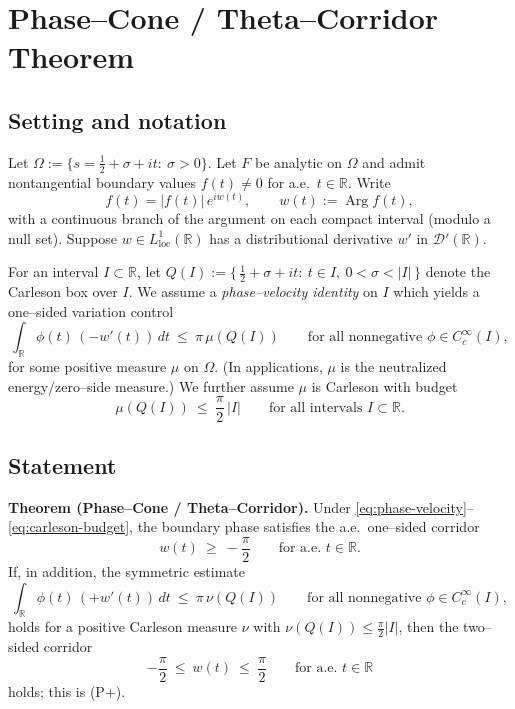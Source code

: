

\section*{Phase–Cone / Theta–Corridor Theorem}


\subsection*{Setting and notation}
Let \(\Omega:=\{s=\tfrac12+\sigma+it:\ \sigma>0\}\). Let \(F\) be analytic on \(\Omega\) and admit nontangential boundary values \(f(t)\neq 0\) for a.e.\ \(t\in\mathbb R\). Write
\[
 f(t)=|f(t)|\,e^{i w(t)},\qquad w(t):=\operatorname{Arg} f(t),
\]
with a continuous branch of the argument on each compact interval (modulo a null set). Suppose \(w\in L^1_{\mathrm{loc}}(\mathbb R)\) has a distributional derivative \(w'\) in \(\mathcal D'(\mathbb R)\).


For an interval \(I\subset\mathbb R\), let \(Q(I):=\{\,\tfrac12+\sigma+it:\ t\in I,\ 0<\sigma<|I|\,\}\) denote the Carleson box over \(I\). We assume a \emph{phase–velocity identity} on \(I\) which yields a one–sided variation control
\begin{equation}\label{eq:phase-velocity}
\int_{\mathbb R} \phi(t)\,(-w'(t))\,dt\ \le\ \pi\,\mu(Q(I))
\qquad\text{for all nonnegative }\phi\in C_c^\infty(I),
\end{equation}
for some positive measure \(\mu\) on \(\Omega\). (In applications, \(\mu\) is the neutralized energy/zero–side measure.) We further assume \(\mu\) is Carleson with budget
\begin{equation}\label{eq:carleson-budget}
\mu(Q(I))\ \le\ \frac{\pi}{2}\,|I|\qquad\text{for all intervals }I\subset\mathbb R.
\end{equation}


\subsection*{Statement}
\noindent\textbf{Theorem (Phase–Cone / Theta–Corridor).}
Under \eqref{eq:phase-velocity}–\eqref{eq:carleson-budget}, the boundary phase satisfies the a.e.\ one–sided corridor
\[
 w(t)\ \ge\ -\frac{\pi}{2}\qquad\text{for a.e. }t\in\mathbb R.
\]
If, in addition, the symmetric estimate
\begin{equation}\label{eq:phase-velocity-plus}
\int_{\mathbb R} \phi(t)\,(+w'(t))\,dt\ \le\ \pi\,\nu(Q(I))
\qquad\text{for all nonnegative }\phi\in C_c^\infty(I),
\end{equation}
holds for a positive Carleson measure \(\nu\) with \(\nu(Q(I))\le \tfrac{\pi}{2}|I|\), then the two–sided corridor
\[
 -\frac{\pi}{2}\ \le\ w(t)\ \le\ \frac{\pi}{2}\qquad\text{for a.e. }t\in\mathbb R
\]
holds; this is (P+).


